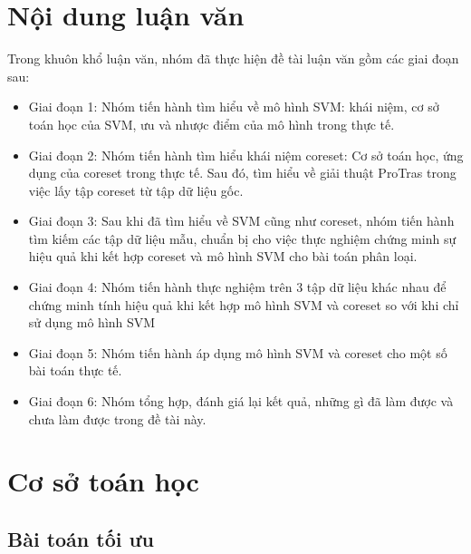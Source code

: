 \documentclass[a4paper, 12pt, oneside]{report}
\begin{document}
\section{Nội dung luận văn}
Trong khuôn khổ luận văn, nhóm đã thực hiện đề tài luận văn gồm các giai đoạn sau:
\begin{itemize}
    \item Giai đoạn 1: Nhóm tiến hành tìm hiểu về mô hình SVM: khái niệm, cơ sở toán học của SVM, ưu và nhược điểm của mô hình trong thực tế.
    \item Giai đoạn 2: Nhóm tiến hành tìm hiểu khái niệm coreset: Cơ sở toán học, ứng dụng của coreset trong thực tế. Sau đó, tìm hiểu về giải thuật ProTras trong việc lấy tập coreset từ tập dữ liệu gốc.
    \item Giai đoạn 3: Sau khi đã tìm hiểu về SVM cũng như coreset, nhóm tiến hành tìm kiếm các tập dữ liệu mẫu, chuẩn bị cho việc thực nghiệm chứng minh sự hiệu quả khi kết hợp coreset và mô hình SVM cho bài toán phân loại.
    \item Giai đoạn 4: Nhóm tiến hành thực nghiệm trên 3 tập dữ liệu khác nhau để chứng minh tính hiệu quả khi kết hợp mô hình SVM và coreset so với khi chỉ sử dụng mô hình SVM
    \item Giai đoạn 5: Nhóm tiến hành áp dụng mô hình SVM và coreset cho một số bài toán thực tế.
    \item Giai đoạn 6: Nhóm tổng hợp, đánh giá lại kết quả, những gì đã làm được và chưa làm được trong đề tài này.
\end{itemize}
\section{Cơ sở toán học}
\subsection{Bài toán tối ưu}
\end{document}
